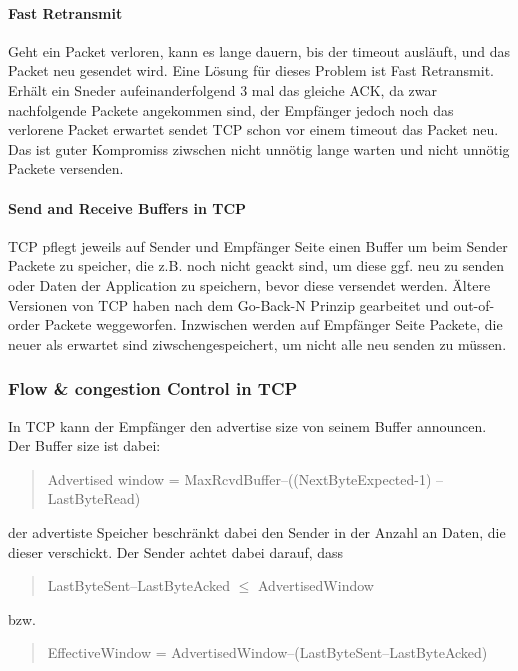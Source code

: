			\paragraph{Fast Retransmit}
				Geht ein Packet verloren, kann es lange dauern, bis der timeout ausläuft, und das Packet neu gesendet wird. Eine Lösung für dieses Problem ist Fast Retransmit. Erhält ein Sneder aufeinanderfolgend 3 mal das gleiche ACK, da zwar nachfolgende Packete angekommen sind, der Empfänger jedoch noch das verlorene Packet erwartet sendet TCP schon vor einem timeout das Packet neu. Das ist guter Kompromiss ziwschen nicht unnötig lange warten und nicht unnötig Packete versenden. 
			
			\paragraph{Send and Receive Buffers in TCP}
				TCP pflegt jeweils auf Sender und Empfänger Seite einen Buffer um beim Sender Packete zu speicher, die z.B. noch nicht geackt sind, um diese ggf. neu zu senden oder Daten der Application zu speichern, bevor diese versendet werden. Ältere Versionen von TCP haben nach dem Go-Back-N Prinzip gearbeitet und out-of-order Packete weggeworfen. Inzwischen werden auf Empfänger Seite Packete, die neuer als erwartet sind ziwschengespeichert, um nicht alle neu senden zu müssen. 

		\subsubsection{Flow \& congestion Control in TCP}
			In TCP kann der Empfänger den advertise size von seinem Buffer announcen. Der Buffer size ist dabei: 
			\begin{quote}
				Advertised window = MaxRcvdBuffer–((NextByteExpected-1) –LastByteRead)
			\end{quote}
			der advertiste Speicher beschränkt dabei den Sender in der Anzahl an Daten, die dieser verschickt. Der Sender achtet dabei darauf, dass 
			\begin{quote}
				LastByteSent–LastByteAcked $\le$ AdvertisedWindow
			\end{quote}
			bzw. \begin{quote}
				EffectiveWindow = AdvertisedWindow–(LastByteSent–LastByteAcked)
			\end{quote}
			
